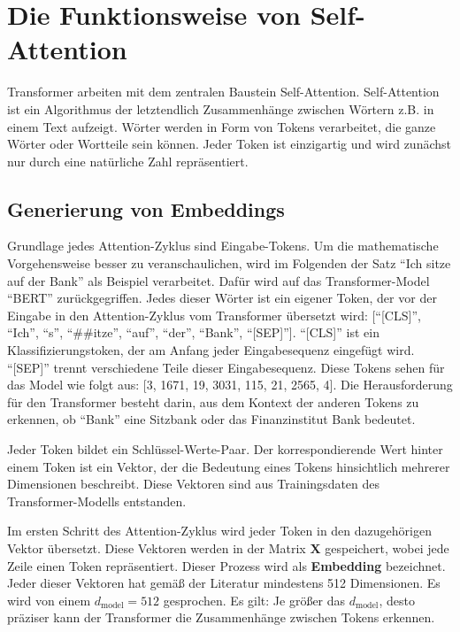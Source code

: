 \chapter{Die Funktionsweise von Self-Attention}

Transformer arbeiten mit dem zentralen Baustein Self-Attention.
Self-Attention ist ein Algorithmus der letztendlich Zusammenhänge zwischen Wörtern z.B. in einem Text aufzeigt.
Wörter werden in Form von Tokens verarbeitet, die ganze Wörter oder Wortteile sein können.
Jeder Token ist einzigartig und wird zunächst nur durch eine natürliche Zahl repräsentiert.

\section{Generierung von Embeddings}

Grundlage jedes Attention-Zyklus sind Eingabe-Tokens.  
Um die mathematische Vorgehensweise besser zu veranschaulichen, wird im Folgenden der Satz \enquote{Ich sitze auf der Bank} als Beispiel verarbeitet.
Dafür wird auf das Transformer-Model \enquote{BERT} zurückgegriffen.
Jedes dieser Wörter ist ein eigener Token, der vor der Eingabe in den Attention-Zyklus vom Transformer übersetzt wird:
[\enquote{[CLS]}, \enquote{Ich}, \enquote{s}, \enquote{##itze}, \enquote{auf}, \enquote{der}, \enquote{Bank}, \enquote{[SEP]}].  
\enquote{[CLS]} ist ein Klassifizierungstoken, der am Anfang jeder Eingabesequenz eingefügt wird.
\enquote{[SEP]} trennt verschiedene Teile dieser Eingabesequenz.
Diese Tokens sehen für das Model wie folgt aus: [3, 1671, 19, 3031, 115, 21, 2565, 4].
Die Herausforderung für den Transformer besteht darin, aus dem Kontext der anderen Tokens zu erkennen, ob \enquote{Bank} eine Sitzbank oder das Finanzinstitut Bank bedeutet.

Jeder Token bildet ein Schlüssel-Werte-Paar.
Der korrespondierende Wert hinter einem Token ist ein Vektor, der die Bedeutung eines Tokens hinsichtlich mehrerer Dimensionen beschreibt.  
Diese Vektoren sind aus Trainingsdaten des Transformer-Modells entstanden.

Im ersten Schritt des Attention-Zyklus wird jeder Token in den dazugehörigen Vektor übersetzt.  
Diese Vektoren werden in der Matrix $\mathbf{X}$ gespeichert, wobei jede Zeile einen Token repräsentiert.  
Dieser Prozess wird als \textbf{Embedding} bezeichnet.  
Jeder dieser Vektoren hat gemäß der Literatur mindestens 512 Dimensionen.  
Es wird von einem \( d_{\text{model}} = 512 \) gesprochen.  
Es gilt: Je größer das \( d_{\text{model}} \), desto präziser kann der Transformer die Zusammenhänge zwischen Tokens erkennen.

